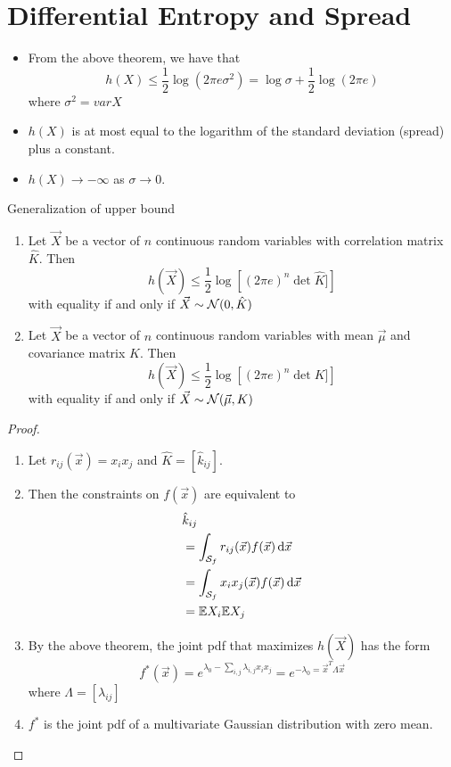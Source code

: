 \documentclass[../main.tex]{subfiles}
\begin{document}
\section{Differential Entropy and Spread}
\begin{itemize}
    \item From the above theorem, we have that \[
    h(X)\leq \frac{1}{2}\log(2\pi e\sigma^2) = \log \sigma + \frac{1}{2}\log(2\pi e)
    \] where $\sigma^2=var X$
    \item $h(X)$ is at most equal to the logarithm of the standard deviation (spread) plus a constant.
    \item $h(X)\to -\infty$ as $\sigma\to 0$.
\end{itemize}
\begin{bbox}{Generalization of upper bound}
    \begin{enumerate}
        \item Let $\vec X$ be a vector of $n$ continuous random variables with correlation matrix $\hat K$. Then \begin{equation*}
        h(\vec X) \leq \frac{1}{2}\log\left[(2\pi e)^n \det \hat K]\right]
    \end{equation*} with equality if and only if $\vec X \sim \mathcal{N}(0, \hat K)$
        \item Let $\vec X$ be a vector of $n$ continuous random variables with mean $\vec \mu$ and covariance matrix $K$. Then \begin{equation*}
        h(\vec X) \leq \frac{1}{2}\log\left[(2\pi e)^n \det K]\right]
    \end{equation*} with equality if and only if $\vec X \sim \mathcal{N}(\vec \mu, K)$
    \end{enumerate}
    \begin{proof}
    \begin{enumerate}
        \item Let $r_{ij}(\vec x)=x_ix_j$ and $\hat K=[\hat k_{ij}]$.
        \item Then the constraints on $f(\vec x)$ are equivalent to \begin{align*}
        &\hat k_{ij}\\
        &=\int_{\mathcal{S}_f}r_{ij}(\vec x)f(\vec x)\,\mathrm{d} \vec x\\
        &=\int_{\mathcal{S}_f}x_i x_j(\vec x)f(\vec x)\,\mathrm{d} \vec x\\
        &=\mathbb{E} X_i \mathbb{E} X_j 
        \end{align*}
    \item By the above theorem, the joint pdf that maximizes $h(\vec X)$ has the form \[
    f^*(\vec x)= e^{\lambda_0 - \sum_{i,j}\lambda_{i,j}x_ix_j} = e^{-\lambda_0=\vec x^T \Lambda \vec x}
    \]
    where $\Lambda = [\lambda_{ij}]$
    \item $f^*$ is the joint pdf of a multivariate Gaussian distribution with zero mean.
    \end{enumerate}
        
    \end{proof}
\end{bbox}
\end{document}

